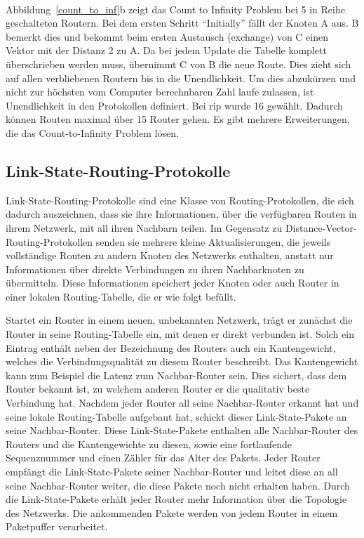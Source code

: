 \documentclass[1pt,a4paper,final]{article}
\begin{document}
 \\
Abbildung~\ref{count_to_inf}b zeigt das Count to Infinity Problem bei 5 in Reihe geschalteten Routern. Bei dem ersten Schritt ``Initially'' fällt der Knoten A aus. B bemerkt dies und bekommt beim ersten Austausch (exchange) von C einen Vektor mit der Distanz 2 zu A. Da bei jedem Update die Tabelle komplett überschrieben werden muss, übernimmt C von B die neue Route. Dies zieht sich auf allen verbliebenen Routern bis in die Unendlichkeit. Um dies abzukürzen und nicht zur höchsten vom Computer berechnbaren Zahl laufe zulassen, ist Unendlichkeit in den Protokollen definiert. Bei \ac{rip} wurde 16 gewählt. Dadurch können Routen maximal über 15 Router gehen. Es gibt mehrere Erweiterungen, die das Count-to-Infinity Problem lösen.

\subsection{Link-State-Routing-Protokolle}
Link-State-Routing-Protokolle sind eine Klasse von Routing-Protokollen, die sich dadurch auszeichnen, dass sie ihre Informationen, über die verfügbaren Routen in ihrem Netzwerk, mit all ihren Nachbarn teilen. 
Im Gegensatz zu Distance-Vector-Routing-Protokollen senden sie mehrere kleine Aktualisierungen, die jeweils vollständige Routen zu andern Knoten des Netzwerks enthalten, anstatt nur Informationen über direkte Verbindungen zu ihren Nachbarknoten zu übermitteln. 
Diese Informationen speichert jeder Knoten oder auch Router in einer lokalen Routing-Tabelle, die er wie folgt befüllt.

Startet ein Router in einem neuen, unbekannten Netzwerk, trägt er zunächst die Router in seine Routing-Tabelle ein, mit denen er direkt verbunden ist. 
Solch ein Eintrag enthält neben der Bezeichnung des Routers auch ein Kantengewicht, welches die Verbindungsqualität zu diesem Router beschreibt. 
Das Kantengewicht kann zum Beispiel die Latenz zum Nachbar-Router sein. 
Dies sichert, dass dem Router bekannt ist, zu welchem anderen Router er die qualitativ beste Verbindung hat. Nachdem jeder Router all seine Nachbar-Router erkannt hat und seine lokale Routing-Tabelle aufgebaut hat, schickt dieser Link-State-Pakete an seine Nachbar-Router. 
Diese Link-State-Pakete enthalten alle Nachbar-Router des Routers und die Kantengewichte zu diesen, sowie eine fortlaufende Sequenznummer und einen Zähler für das Alter des Pakets. 
Jeder Router empfängt die Link-State-Pakete seiner Nachbar-Router und leitet diese an all seine Nachbar-Router weiter, die diese Pakete noch nicht erhalten haben. 
Durch die Link-State-Pakete erhält jeder Router mehr Information über die Topologie des Netzwerks. 
Die ankommenden Pakete werden von jedem Router in einem Paketpuffer verarbeitet.
\end{document}
